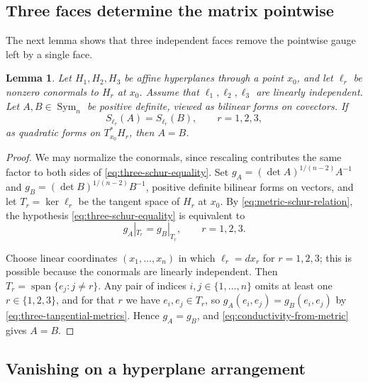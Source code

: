 \documentclass[11pt,oneside]{article}
\newtheorem{lemma}[theorem]{Lemma}
\newcommand{\Sym}{\operatorname{Sym}}
\begin{document}
\subsection{Three faces determine the matrix pointwise}

The next lemma shows that three independent faces remove the pointwise gauge
left by a single face.

\begin{lemma}
\label{lem:three-schur-pointwise}
Let \(H_1,H_2,H_3\) be affine hyperplanes through a point \(x_0\), and let
\(\ell_r\) be nonzero conormals to \(H_r\) at \(x_0\).  Assume that
\(\ell_1,\ell_2,\ell_3\) are linearly independent.  Let \(A,B\in \Sym_n\) be
positive definite, viewed as bilinear forms on covectors.  If
\begin{equation}
  S_{\ell_r}(A)=S_{\ell_r}(B),\qquad r=1,2,3,
  \label{eq:three-schur-equality}
\end{equation}
as quadratic forms on \(T^*_{x_0}H_r\), then \(A=B\).
\end{lemma}

\begin{proof}
We may normalize the conormals, since rescaling contributes the same factor to
both sides of \eqref{eq:three-schur-equality}.  Set
\(g_A=(\det A)^{1/(n-2)}A^{-1}\) and
\(g_B=(\det B)^{1/(n-2)}B^{-1}\), positive definite bilinear forms on vectors,
and let \(T_r=\ker\ell_r\) be the tangent space of \(H_r\) at \(x_0\).  By
\eqref{eq:metric-schur-relation}, the hypothesis
\eqref{eq:three-schur-equality} is equivalent to
\begin{equation}
  g_A|_{T_r}=g_B|_{T_r},\qquad r=1,2,3.
  \label{eq:three-tangential-metrics}
\end{equation}

Choose linear coordinates
\((x_1,\ldots,x_n)\) in which \(\ell_r=dx_r\) for \(r=1,2,3\); this is possible
because the conormals are linearly independent.  Then
\(T_r=\operatorname{span}\{e_j:j\ne r\}\).  Any pair of indices
\(i,j\in\{1,\ldots,n\}\) omits at least one \(r\in\{1,2,3\}\), and for that
\(r\) we have \(e_i,e_j\in T_r\), so
\(g_A(e_i,e_j)=g_B(e_i,e_j)\) by \eqref{eq:three-tangential-metrics}.  Hence
\(g_A=g_B\), and \eqref{eq:conductivity-from-metric} gives \(A=B\).
\end{proof}


\subsection{Vanishing on a hyperplane arrangement}
\end{document}
